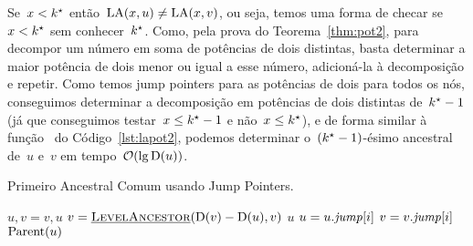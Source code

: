 \documentclass[../../main.tex]{subfiles}
\begin{document}
Se~${x < k^\star}$ então~${\operatorname{LA}(x, u) \neq \operatorname{LA}(x, v)}$, ou seja, temos uma forma de checar se~$x < k^\star$ sem conhecer~$k^\star$. Como, pela prova do Teorema~\ref{thm:pot2}, para decompor um número em soma de potências de dois distintas, basta determinar a maior potência de dois menor ou igual a esse número, adicioná-la à decomposição e repetir. Como temos jump pointers para as potências de dois para todos os nós, conseguimos determinar a decomposição em potências de dois distintas de~${k^\star - 1}$ (já que conseguimos testar~${x \leq k^\star - 1}$ e não~${x \leq k^\star}$), e de forma similar à função~ do Código~\ref{lst:lapot2}, podemos determinar o~\mbox{$(k^\star-1)$-ésimo} ancestral de~$u$ e~$v$ em tempo~$\mathcal{O}(\lg \operatorname{D}(u))$.

\begin{algorithm}
\caption{Primeiro Ancestral Comum usando Jump Pointers. \label{lst:lcapot2}}
\begin{algorithmic}[1]
			\State $u, v = v, u$ 
		\EndIf
		\State $v = \mbox{\textsc{\underline{LevelAncestor}}\ensuremath{(\operatorname{D}(v) - \operatorname{D}(u), v)}}$ 
		 \label{lst:lcapot2:if2}
			\State \Return $u$
		\EndIf
		 \label{lst:lcapot2:for}
			 \label{lst:lcapot2:iffor}
				\State $u = u.\mathit{jump}[i]$
				\State $v = v.\mathit{jump}[i]$
			\EndIf
		\EndFor
		\State \Return $\operatorname{Parent}(u)$
	\EndFunction
\end{algorithmic}
\end{algorithm}
\end{document}
